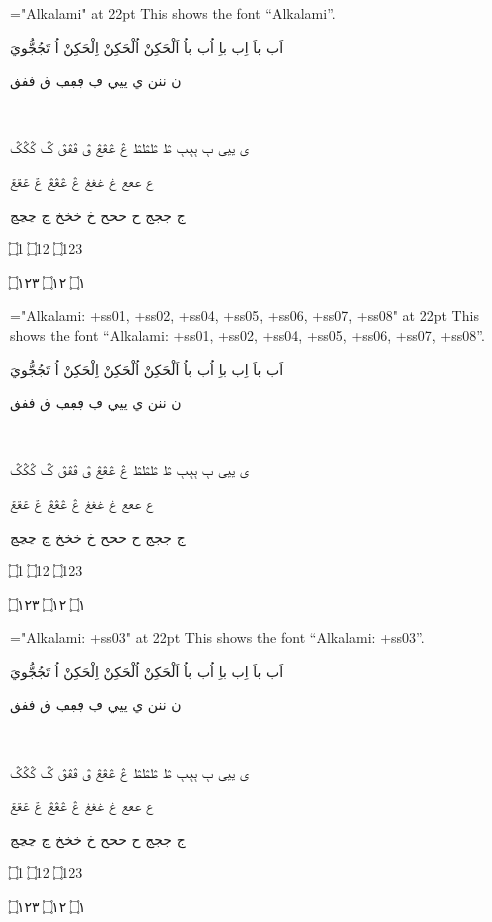 

\vsize=9.5in
\nopagenumbers
\parindent=0pt
\def\testFont#1{
  \font\x="#1" at 22pt \x
    This shows the font “#1”. \par\touching\par\warsh\par\imala\par\wagaf\par\ain\par\jeem\par\endayahA\par\endayahB\par}

\baselineskip=20pt

\def\warsh{\beginR ن ننن      ي ييي      ڢ ڢڢڢ      ڧ ڧڧڧ  \endR} %
\def\touching{\beginR اَب باَ  اِب باِ اُب باُ  اَلْحَكِنْ اُلْحَكِنْ اِلْحَكِنْ  اُ تَجُجُّويَ  \endR} %
\def\endayahA{\beginR ۝1   ۝12   ۝123   \endR} %
\def\endayahB{\beginR ۝١   ۝١٢   ۝١٢٣ \endR} %
\def\imala{\beginR بٜ  \endR} %
\def\wagaf{\beginR ی ییی      ٻ ٻٻٻ      ڟ ڟڟڟ      ڠ ڠڠڠ      ڨ ڨڨڨ      ݣ ݣݣݣ  \endR} %
\def\ain{\beginR  ع ععع غ غغغ ڠ ڠڠڠ ݝ ݝݝݝ  \endR} %
\def\jeem{\beginR ج ججج ح ححح خ خخخ ڃ ڃڃڃ   \endR} %
\def\lamalef{\beginR لإ ‍لإ لَإِ ‍لَإِ لأ ‍لأ لَأَ ‍لَأَ لإ ‍لإ لَإِ ‍لَإِ لأ ‍لأ لَأَ ‍لَأَ لآ ‍لآ لَآَ ‍لَآَ لا ‍لا لَاَ ‍لَاَ \endR} 
\bigskip


\testFont{Alkalami}

\bigskip

\testFont{Alkalami:
       +ss01, +ss02, +ss04, +ss05, +ss06, +ss07, +ss08}

\bigskip

\testFont{Alkalami:
       +ss03}

\bigskip


\bigskip

\bye

